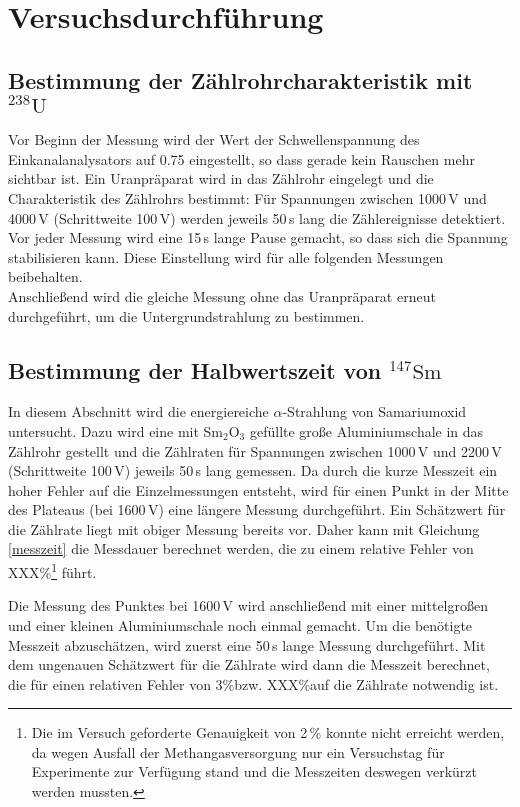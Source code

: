 \section{Versuchsdurchführung}

\subsection{Bestimmung der Zählrohrcharakteristik mit \texorpdfstring{${}^{238}\text{U}$}{U-238}}
Vor Beginn der Messung wird der Wert der Schwellenspannung des
Einkanalanalysators auf 0.75 eingestellt, so dass gerade kein Rauschen mehr
sichtbar ist. Ein Uranpräparat wird in das Zählrohr eingelegt und die
Charakteristik des Zählrohrs bestimmt: Für Spannungen zwischen 1000\,V und
4000\,V (Schrittweite 100\,V) werden jeweils 50\,s lang die Zählereignisse
detektiert. Vor jeder Messung wird eine 15\,s lange Pause gemacht, so dass sich
die Spannung stabilisieren kann. Diese Einstellung wird für alle folgenden
Messungen beibehalten.\\
Anschließend wird die gleiche Messung ohne das Uranpräparat erneut durchgeführt,
um die Untergrundstrahlung zu bestimmen.

\subsection{Bestimmung der Halbwertszeit von \texorpdfstring{${}^{147}\text{Sm}$}{Sm-147}}
In diesem Abschnitt wird die energiereiche $\alpha$-Strahlung von Samariumoxid
untersucht. Dazu wird eine mit Sm$_2$O$_3$ gefüllte große Aluminiumschale in das Zählrohr
gestellt und die Zählraten für Spannungen zwischen 1000\,V und 2200\,V
(Schrittweite 100\,V) jeweils 50\,s lang gemessen.
Da durch die kurze Messzeit ein hoher Fehler auf die Einzelmessungen entsteht,
wird für einen Punkt in der Mitte des Plateaus (bei 1600\,V) eine längere Messung durchgeführt.
Ein Schätzwert für die Zählrate liegt mit obiger Messung bereits vor. Daher kann mit Gleichung 
\ref{messzeit} die Messdauer berechnet werden, die zu einem relative Fehler von
XXX\%\footnote{Die im Versuch geforderte Genauigkeit von 2\,\% konnte nicht
erreicht werden, da wegen Ausfall der Methangasversorgung nur ein Versuchstag
für Experimente zur Verfügung stand und die Messzeiten deswegen verkürzt werden
mussten.}
führt.

Die Messung des Punktes bei 1600\,V wird anschließend mit einer mittelgroßen
und einer kleinen Aluminiumschale noch einmal gemacht.
Um die benötigte Messzeit abzuschätzen, wird zuerst eine
50\,s lange Messung durchgeführt. Mit dem ungenauen Schätzwert für die Zählrate
wird dann die Messzeit berechnet,
die für einen relativen Fehler von 3\%\footnotemark[1] bzw. XXX\%\footnotemark[1]
auf die Zählrate notwendig ist.

